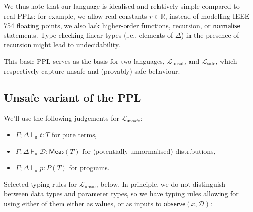 \documentclass[preprint]{uai2026} %
\newcommand{\Lsafe}{\mathcal{L}_{\text{safe}}}
\newcommand{\Lunsafe}{\mathcal{L}_{\text{unsafe}}}
\newcommand{\unsafevdash}{\vdash_{\text{u}}}
\newcommand{\observe}[2]{\mathsf{observe}(#1,#2)}
\newcommand{\score}[1]{\mathsf{score}(#1)}
\newcommand{\Meas}{\mathsf{Meas}}
\newcommand{\Prob}{\mathsf{Prob}}
\begin{document}
We thus note that our language is idealised and relatively simple compared to real PPLs: for example, we allow real constants $r \in \mathbb{R}$, instead of modelling IEEE 754 floating points, we also lack higher-order functions, recursion, or $\mathsf{normalise}$ statements. 
Type-checking linear types (i.e., elements of $\Delta$) in the presence of recursion might lead to undecidability. 



This basic PPL serves as the basis for two languages, $\Lunsafe$ and $\Lsafe$, which respectively capture unsafe and (provably) safe behaviour.


\subsection{Unsafe variant of the PPL}
We'll use the following judgements for $\Lunsafe$:
\begin{itemize}
    \item $\Gamma;\Delta \unsafevdash t:T$ for pure terms,
    \item $\Gamma;\Delta \unsafevdash \mathcal{D}:\Meas(T)$ for (potentially unnormalised) distributions,
    \item $\Gamma;\Delta \unsafevdash p:P(T)$ for programs.
\end{itemize}

Selected typing rules for $\Lunsafe$ below. In principle, we do not distinguish between data types and parameter types, so we have typing rules allowing for using either of them either as values, or as inputs to $\observe{x}{\mathcal D}$:
\end{document}
